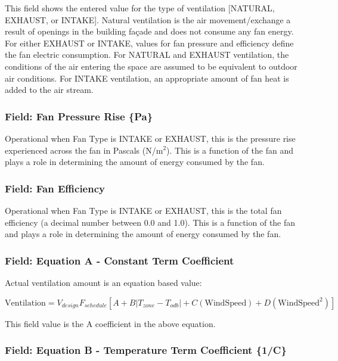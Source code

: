 This field shows the entered value for the type of ventilation {[}NATURAL, EXHAUST, or INTAKE{]}. Natural ventilation is the air movement/exchange a result of openings in the building façade and does not consume any fan energy. For either EXHAUST or INTAKE, values for fan pressure and efficiency define the fan electric consumption. For NATURAL and EXHAUST ventilation, the conditions of the air entering the space are assumed to be equivalent to outdoor air conditions. For INTAKE ventilation, an appropriate amount of fan heat is added to the air stream.

\subsubsection{Field: Fan Pressure Rise \{Pa\}}\label{field-fan-pressure-rise-pa}

Operational when Fan Type is INTAKE or EXHAUST, this is the pressure rise experienced across the fan in Pascals (N/m\(^{2}\)). This is a function of the fan and plays a role in determining the amount of energy consumed by the fan.

\subsubsection{Field: Fan Efficiency}\label{field-fan-efficiency}

Operational when Fan Type is INTAKE or EXHAUST, this is the total fan efficiency (a decimal number between 0.0 and 1.0). This is a function of the fan and plays a role in determining the amount of energy consumed by the fan.

\subsubsection{Field: Equation A - Constant Term Coefficient}\label{field-equation-a---constant-term-coefficient-1}

Actual ventilation amount is an equation based value:

\begin{equation}
\text{Ventilation} = V_{design} F_{schedule} \left[ A + B \left| T_{zone}-T_{odb} \right| + C\left(\text{WindSpeed}\right) + D\left(\text{WindSpeed}^2\right)  \right]
\end{equation}

This field value is the A coefficient in the above equation.

\subsubsection{Field: Equation B - Temperature Term Coefficient \{1/C\}}\label{field-equation-b---temperature-term-coefficient-1c-1}

